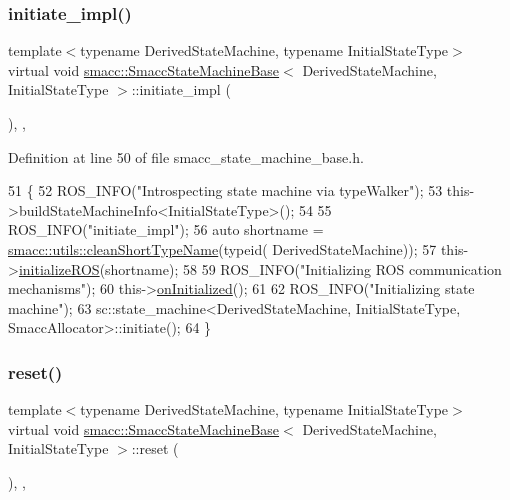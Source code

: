 \subsubsection{\texorpdfstring{initiate\+\_\+impl()}{initiate\_impl()}}
{\footnotesize\ttfamily template$<$typename Derived\+State\+Machine, typename Initial\+State\+Type$>$ \\
virtual void \hyperlink{structsmacc_1_1SmaccStateMachineBase}{smacc\+::\+Smacc\+State\+Machine\+Base}$<$ Derived\+State\+Machine, Initial\+State\+Type $>$\+::initiate\+\_\+impl (\begin{DoxyParamCaption}{ }\end{DoxyParamCaption})\hspace{0.3cm}{\ttfamily [inline]}, {\ttfamily [override]}, {\ttfamily [virtual]}}



Definition at line 50 of file smacc\+\_\+state\+\_\+machine\+\_\+base.\+h.


\begin{DoxyCode}
51     \{
52         ROS\_INFO(\textcolor{stringliteral}{"Introspecting state machine via typeWalker"});
53         this->buildStateMachineInfo<InitialStateType>();
54 
55         ROS\_INFO(\textcolor{stringliteral}{"initiate\_impl"});
56         \textcolor{keyword}{auto} shortname = \hyperlink{namespacesmacc_1_1utils_aacd1975bb7cd9bec4b50e111a2ae7edb}{smacc::utils::cleanShortTypeName}(\textcolor{keyword}{typeid}(
      DerivedStateMachine));
57         this->\hyperlink{classsmacc_1_1ISmaccStateMachine_a1136dd5d81e846ac86de48bc71912cbf}{initializeROS}(shortname);        
58 
59         ROS\_INFO(\textcolor{stringliteral}{"Initializing ROS communication mechanisms"});
60         this->\hyperlink{classsmacc_1_1ISmaccStateMachine_a95e7f71d0d88fffd0afebb1f9ccdade5}{onInitialized}();
61 
62         ROS\_INFO(\textcolor{stringliteral}{"Initializing state machine"});
63         sc::state\_machine<DerivedStateMachine, InitialStateType, SmaccAllocator>::initiate();
64     \}
\end{DoxyCode}
\mbox{\label{structsmacc_1_1SmaccStateMachineBase_af34aec9fa012f0e3858131c84abfd5ed}} 
\subsubsection{\texorpdfstring{reset()}{reset()}}
{\footnotesize\ttfamily template$<$typename Derived\+State\+Machine, typename Initial\+State\+Type$>$ \\
virtual void \hyperlink{structsmacc_1_1SmaccStateMachineBase}{smacc\+::\+Smacc\+State\+Machine\+Base}$<$ Derived\+State\+Machine, Initial\+State\+Type $>$\+::reset (\begin{DoxyParamCaption}{ }\end{DoxyParamCaption})\hspace{0.3cm}{\ttfamily [inline]}, {\ttfamily [override]}, {\ttfamily [virtual]}}



